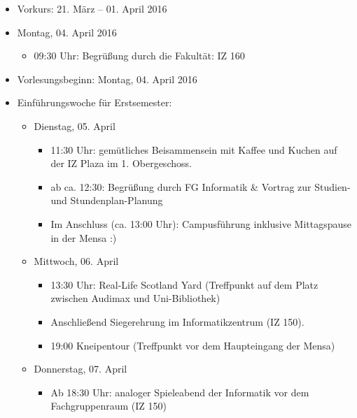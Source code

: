\begin{itemize}
	\item Vorkurs: 21. März – 01. April 2016

	\item Montag, 04. April 2016
	\begin{itemize}
		\item 09:30 Uhr: Begrüßung durch die Fakultät: IZ 160
	\end{itemize}

	\item Vorlesungsbeginn: Montag, 04. April 2016

	\item Einführungswoche für Erstsemester:
	\begin{itemize}
		\item Dienstag, 05. April
		\begin{itemize}
			\item 11:30 Uhr: gemütliches Beisammensein mit Kaffee und Kuchen auf der IZ Plaza im 1. Obergeschoss.
			\item ab ca. 12:30: Begrüßung durch FG Informatik \& Vortrag zur Studien- und Stundenplan-Planung
			\item Im Anschluss (ca. 13:00 Uhr): Campusführung inklusive Mittagspause in der Mensa :)
		\end{itemize}

		\item Mittwoch, 06. April
		\begin{itemize}
			\item 13:30 Uhr: Real-Life Scotland Yard (Treffpunkt auf dem Platz zwischen Audimax und Uni-Bibliothek)
			\item Anschließend Siegerehrung im Informatikzentrum (IZ 150).
			\item 19:00 Kneipentour (Treffpunkt vor dem Haupteingang der Mensa)
		\end{itemize}

		\item Donnerstag, 07. April
		\begin{itemize}
			\item Ab 18:30 Uhr: analoger Spieleabend der Informatik vor dem Fachgruppenraum (IZ 150)
		\end{itemize}
	\end{itemize}


\end{itemize}
